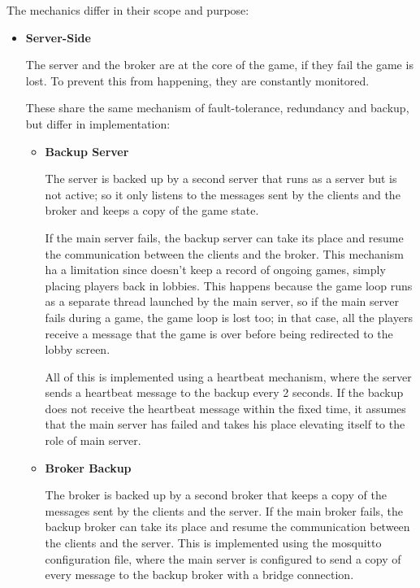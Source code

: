 \documentclass{scrartcl}
\begin{document}
The mechanics differ in their scope and purpose:
\begin{itemize}
      \item
            \textbf{Server-Side} \par
            The server and the broker are at the core of the game, if they fail the game is lost.
            To prevent this from happening, they are constantly monitored.

            These share the same mechanism of fault-tolerance, redundancy and backup,
            but differ in implementation:

            \begin{itemize}
                  \item \textbf{Backup Server} \par
                        The server is backed up by a second server that runs as a server but is
                        not active; so it only listens to the messages sent by the clients and the broker
                        and keeps a copy of the game state.

                        If the main server fails, the backup server can take its place and resume
                        the communication between the clients and the broker. This mechanism ha a limitation
                        since doesn't keep a record of ongoing games, simply placing players back in lobbies.
                        This happens because the game loop runs as a separate thread launched by
                        the main server, so if the main server fails during a game, the game loop
                        is lost too; in that case, all the players receive a message that the
                        game is over before being redirected to the lobby screen.

                        All of this is implemented using a heartbeat mechanism, where the server sends a
                        heartbeat message to the backup every 2 seconds. If the backup does not
                        receive the heartbeat message within the fixed time, it assumes that
                        the main server has failed and takes his place elevating itself to the role of
                        main server.
                  \item \textbf{Broker Backup} \par
                        The broker is backed up by a second broker that keeps a copy of the messages
                        sent by the clients and the server.
                        If the main broker fails, the backup broker can take its place and resume
                        the communication between the clients and the server.
                        This is implemented using the mosquitto configuration file, where the main
                        server is configured to send a copy of every message to the backup broker
                        with a bridge connection.


\end{itemize}
\end{itemize}
\end{document}
